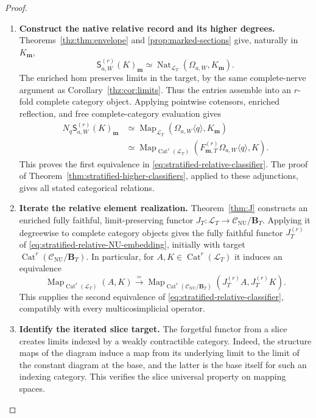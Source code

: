 \documentclass[oneside]{article}
\theoremstyle{plain}
\theoremstyle{definition}
\theoremstyle{remark}
\newcommand{\B}{\mathbf B}
\newcommand{\CNU}{\mathcal C_{\mathrm{NU}}}
\newcommand{\J}{J}
\newcommand{\Map}{\operatorname{Map}}
\newcommand{\Nat}{\operatorname{Nat}}
\begin{document}
\begin{proof}
\leavevmode
\begin{enumerate}
\item \textbf{Construct the native relative record and its higher degrees.}
Theorems~\ref{thz:thm:envelope} and
\ref{prop:marked-sections} give, naturally in $K_{\mathbf m}$,
\[
 \mathsf S^{(r)}_{a,W}(K)_{\mathbf m}
 \simeq\Nat_{\mathcal L_T}(\Omega_{a,W},K_{\mathbf m}).
\]
The enriched hom preserves limits in the target, by the same
complete-nerve argument as Corollary~\ref{thz:cor:limits}.  Thus the
entries assemble into an $r$-fold complete category object.  Applying
pointwise cotensors, enriched reflection, and free complete-category
evaluation gives
\begin{align*}
 N_q\mathsf S^{(r)}_{a,W}(K)_{\mathbf m}
 &\simeq\Map_{\mathcal L_T}
 (\Omega_{a,W}\langle q\rangle,K_{\mathbf m})\\
 &\simeq\Map_{\operatorname{Cat}^r(\mathcal L_T)}
 (F^{(r)}_{\mathbf m,T}\Omega_{a,W}\langle q\rangle,K).
\end{align*}
This proves the first equivalence in
\eqref{eq:stratified-relative-classifier}.  The proof of
Theorem~\ref{thm:stratified-higher-classifiers}, applied to these
adjunctions, gives all stated categorical relations.
\item \textbf{Iterate the relative element realization.}
Theorem~\ref{thm:J} constructs an enriched fully faithful,
limit-preserving functor
$\J_T:\mathcal L_T\to\CNU/\B_T$.
Applying it degreewise to complete category objects gives the
fully faithful functor $\J_T^{(r)}$ of
\eqref{eq:stratified-relative-NU-embedding}, initially with target
$\operatorname{Cat}^r(\CNU/\B_T)$.  In particular, for
$A,K\in\operatorname{Cat}^r(\mathcal L_T)$ it induces an equivalence
\[
 \Map_{\operatorname{Cat}^r(\mathcal L_T)}(A,K)
 \xrightarrow{\simeq}
 \Map_{\operatorname{Cat}^r(\CNU/\B_T)}
       (\J_T^{(r)}A,\J_T^{(r)}K).
\]
This supplies the second equivalence of
\eqref{eq:stratified-relative-classifier}, compatibly with every
multicosimplicial operator.
\item \textbf{Identify the iterated slice target.}
The forgetful functor from a slice creates limits indexed by a
weakly contractible category. Indeed, the structure maps of the
diagram induce a map from its underlying limit to the limit of the
constant diagram at the base, and the latter is the base itself
for such an indexing category. This verifies the slice universal
property on mapping spaces.


\end{enumerate}
\end{proof}
\end{document}
